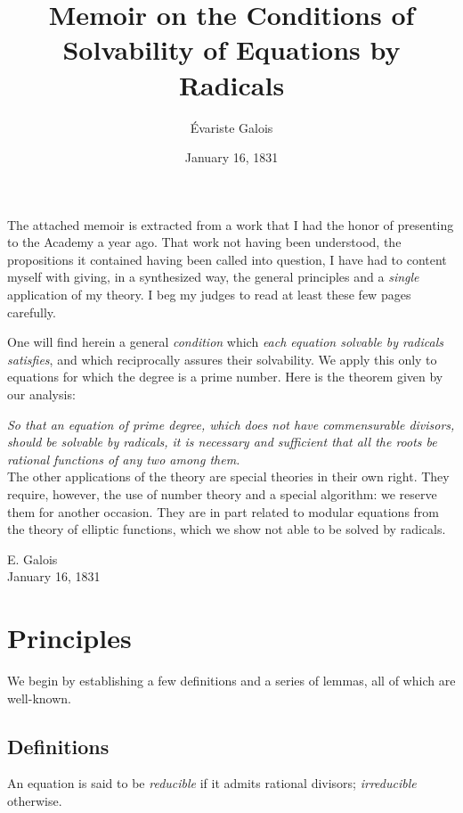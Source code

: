 \documentclass{article}
\title{Memoir on the Conditions of Solvability of Equations by Radicals}
\author{Évariste Galois}
\date{January 16, 1831}
\begin{document}
\maketitle

The attached memoir is extracted from a work that I had the honor of presenting to the Academy a year ago. That work not having been understood, the propositions it contained having been called into question, I have had to content myself with giving, in a synthesized way, the general principles and a \textit{single} application of my theory. I beg my judges to read at least these few pages carefully.

One will find herein a general \textit{condition} which \textit{each equation solvable by radicals satisfies}, and which reciprocally assures their solvability. We apply this only to equations for which the degree is a prime number. Here is the theorem given by our analysis:

\textit{
So that an equation of prime degree, which does not have commensurable divisors, should be solvable by radicals, it is necessary and sufficient that all the roots be rational functions of any two among them.
}
\\

The other applications of the theory are special theories in their own right. They require, however, the use of number theory and a special algorithm: we reserve them for another occasion. They are in part related to modular equations from the theory of elliptic functions, which we show not able to be solved by radicals.

\begin{flushright}
E. Galois \\
January 16, 1831
\end{flushright}


\section*{Principles}

We begin by establishing a few definitions and a series of lemmas, all of which are well-known.

\subsection*{Definitions}

An equation is said to be \textit{reducible} if it admits rational divisors; \textit{irreducible} otherwise.
\end{document}
